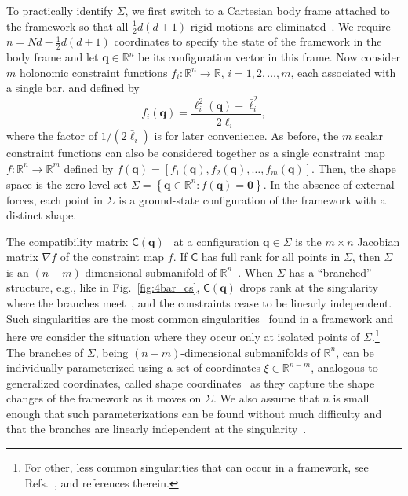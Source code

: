 To practically identify $\Sigma$, we first switch to a Cartesian body frame attached to the framework so that all $\frac{1}{2}d(d+1)$ rigid motions are eliminated~\cite{herschbach1959,echenique2011}.
We require $n = Nd - \frac{1}{2}d(d+1)$ coordinates to specify the state of the framework in the body frame and let $\bm{q} \in \mathbb{R}^{n}$ be its configuration vector in this frame.
Now consider $m$ holonomic constraint functions $f_i: \mathbb{R}^{n} \to \mathbb{R},\,i=1,2,\ldots,m$, each associated with a single bar, and defined by
%
\begin{equation}
  f_i(\bm{q}) = \frac{\ell_i^2(\bm{q}) - \bar{\ell}_i^2}{2\bar{\ell}_i},
\end{equation}
%
where the factor of $1/(2\bar{\ell}_i)$ is for later convenience.
As before, the $m$ scalar constraint functions can also be considered together as a single constraint map $f: \mathbb{R}^{n} \to \mathbb{R}^m$ defined by $f(\bm{q}) = [f_1(\bm{q}), f_2(\bm{q}), \ldots, f_m(\bm{q})]$.
Then, the shape space is the zero level set $\Sigma = \left\{\bm{q} \in \mathbb{R}^{n}: f(\bm{q}) = \bm{0} \right\}$.
In the absence of external forces, each point in $\Sigma$ is a ground-state configuration of the framework with a distinct shape.

The compatibility matrix $\mathsf{C}(\bm{q})$~\cite{pellegrino1986,lubensky2015} at a configuration $\bm{q} \in \Sigma$ is the $m \times n$ Jacobian matrix $\nabla f$ of the constraint map $f$.
If $\mathsf{C}$ has full rank for all points in $\Sigma$, then $\Sigma$ is an $(n - m)$-dimensional submanifold of $\mathbb{R}^{n}$~\cite{leimkuhler2005,lee2013}.
When $\Sigma$ has a ``branched'' structure, e.g., like in Fig.~\ref{fig:4bar_cs}, $\mathsf{C}(\bm{q})$ drops rank at the singularity where the branches meet~\cite{lopez-custodio2020,muller2019}, and the constraints cease to be linearly independent.
Such singularities are the most common singularities~\cite{lopez-custodio2019,lopez-custodio2020} found in a framework and here we consider the situation where they occur only at isolated points of $\Sigma$.\footnote{For other, less common singularities that can occur in a framework, see Refs.~\cite{lopez-custodio2020,muller2019,muller2017}, and references therein.}
The branches of $\Sigma$, being $(n-m)$-dimensional submanifolds of $\mathbb{R}^{n}$, can be individually parameterized using a set of coordinates $\xi \in \mathbb{R}^{n-m}$, analogous to generalized coordinates, called shape coordinates~\cite{littlejohn1995} as they capture the shape changes of the framework as it moves on $\Sigma$.
We also assume that $n$ is small enough that such parameterizations can be found without much difficulty and that
the branches are linearly independent at the singularity~\cite{lopez-custodio2020}.

